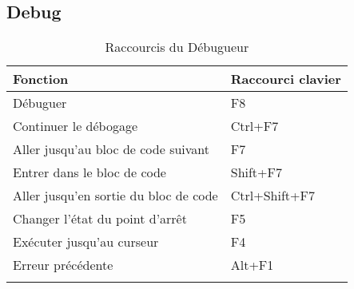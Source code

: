 \subsection{Debug}

{\small 
\begin{longtable}{|l|l|}\hline
\textbf{Fonction}		                &	\textbf{Raccourci clavier}  \\ \hline
\endhead    %
Débuguer 	                            &   F8                          \\ \hline
Continuer le débogage 	                &   Ctrl+F7                     \\ \hline
Aller jusqu'au bloc de code suivant     &   F7                          \\ \hline
Entrer dans le bloc de code	            &   Shift+F7                    \\ \hline
Aller jusqu'en sortie du bloc de code	&   Ctrl+Shift+F7               \\ \hline
Changer l'état du point d'arrêt 	    &   F5                          \\ \hline
Exécuter jusqu'au curseur	            &   F4                          \\ \hline
Erreur précédente	                    &   Alt+F1                      \\ \hline
\caption{Raccourcis du Débugueur}
\end{longtable}
}
